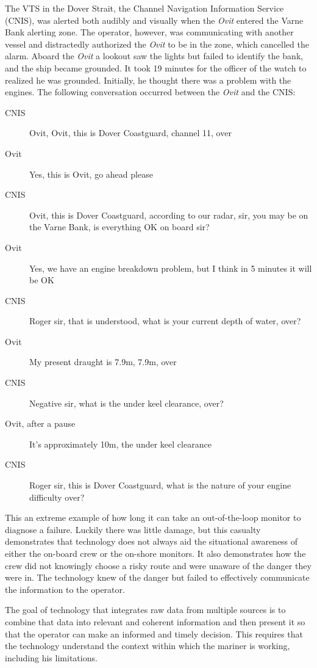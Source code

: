 \documentclass[twoside,symmetric,notoc]{tufte-book}
\begin{document}
\par{
The VTS in the Dover Strait, the Channel Navigation Information Service (CNIS), was alerted both audibly and visually when the \textit{Ovit} entered the Varne Bank alerting zone. The operator, however, was communicating with another vessel and distractedly authorized the \textit{Ovit} to be in the zone, which cancelled the alarm. Aboard the \textit{Ovit} a lookout saw the lights but failed to identify the bank, and the ship became grounded. It took 19 minutes for the officer of the watch to realized he was grounded. Initially, he thought there was a problem with the engines. The following conversation occurred between the \textit{Ovit} and the CNIS: 
\begin{description}
\item[CNIS] Ovit, Ovit, this is Dover Coastguard, channel 11, over
\item[Ovit] Yes, this is Ovit, go ahead please
\item[CNIS] Ovit, this is Dover Coastguard, according to our radar, sir, you may be on the Varne Bank, is everything OK on board sir?
\item[Ovit] Yes, we have an engine breakdown problem, but I think in 5 minutes it will be OK
\item[CNIS] Roger sir, that is understood, what is your current depth of water, over?
\item[Ovit] My present draught is 7.9m, 7.9m, over
\item[CNIS] Negative sir, what is the under keel clearance, over?
\item[Ovit, after a pause] It's approximately 10m, the under keel clearance
\item[CNIS] Roger sir, this is Dover Coastguard, what is the nature of your engine difficulty over?
\end{description}
This an extreme example of how long it can take an out-of-the-loop monitor to diagnose a failure. Luckily there was little damage, but this casualty demonstrates that technology does not always aid the situational awareness of either the on-board crew or the on-shore monitors.\cite{MAIB_Ovit} It also demonstrates how the crew did not knowingly choose a risky route and were unaware of the danger they were in. The technology knew of the danger but failed to effectively communicate the information to the operator.
}
\par{%
The goal of technology that integrates raw data from multiple sources is to combine that data into relevant and coherent information and then present it so that the operator can make an informed and timely decision.\cite{Holsopple} This requires that the technology understand the context within which the mariner is working, including his limitations.
}
\end{document}
